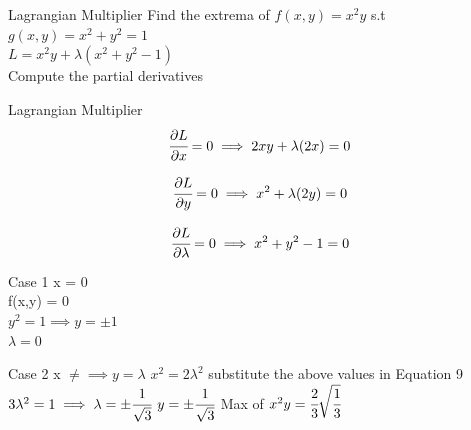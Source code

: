 \documentclass{beamer}
\begin{document}
\begin{frame}{Lagrangian Multiplier}
    Find the extrema of $f(x,y) =x^{2}y$ s.t $g(x,y)=x^{2}+y^{2} = 1$ \\
    \vspace{1em}
    $L = x^{2}y + \lambda (x^{2} + y^{2} - 1)$\\
    \vspace{1em}
    Compute the partial derivatives
\end{frame}

\begin{frame}{Lagrangian Multiplier}
    \begin{equation}
        \cfrac{\partial L}{\partial x} = 0 \implies 2xy + \lambda(2x) = 0
    \end{equation}
    
    \begin{equation}
        \cfrac{\partial L}{\partial y} = 0 \implies x^{2} + \lambda(2y) = 0
    \end{equation}
    
    \begin{equation}
        \cfrac{\partial L}{\partial \lambda} = 0 \implies x^{2} + y^{2} - 1 = 0
    \end{equation}
\end{frame}

\begin{frame}{Case 1}
    x = 0\\
    \vspace{1em}
    f(x,y) = 0\\
    \vspace{1em}
    $y^{2} = 1 \implies y= \pm 1$\\
    \vspace{1em}
    $\lambda = 0$
\end{frame}

\begin{frame}{Case 2}
    x $\neq  \implies y = \lambda$
    \vspace{1em}
    $x^{2} = 2\lambda^{2}$ substitute the above values in Equation 9
    \vspace{1em}
    $3\lambda^{2} = 1 \implies \lambda = \pm \cfrac{1}{\sqrt{3}}$
    \vspace{1em}
    $y = \pm \cfrac{1}{\sqrt{3}}$
    \vspace{1em}
    Max of $x^{2}y = \cfrac{2}{3} \sqrt{\cfrac{1}{3}}$
\end{frame}
\end{document}
